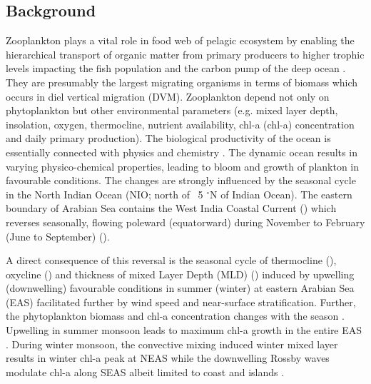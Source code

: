 \documentclass{article}
\begin{document}
	\subsection{Background}
	Zooplankton plays a vital role in food web of pelagic ecosystem by enabling the hierarchical transport of organic matter from primary producers to higher trophic levels impacting the fish population \citep{ohman2001density} and the carbon pump of the deep ocean \citep{le2016global}. They are presumably the largest migrating organisms in terms of biomass \citep{hays2003review} which occurs in diel vertical migration (DVM). Zooplankton depend not only on phytoplankton but other environmental parameters (e.g. mixed layer depth, insolation, oxygen, thermocline, nutrient availability, chl-a (chl-a) concentration and daily primary production). The biological productivity of the ocean is essentially connected with physics and chemistry \citep{subrahmanyan1959studiespart2, ryther1966primary, qasim1977biological, nair1970primary,banse1995zooplankton,mccreary2009biophysical, vijith2016consequences,amol2020modulation}. The dynamic ocean results in varying physico-chemical properties, leading to bloom and growth of plankton in favourable conditions. The changes are strongly influenced by the seasonal cycle in the North Indian Ocean (NIO; north of ~5 $^{\circ}$N of Indian Ocean). The eastern boundary of Arabian Sea contains the West India Coastal Current (\citep[WICC]{ramamirtham1965hydrography, banse1968hydrography, shetye1990hydrography,mccreary1993numerical, amol2014observed, vijith2016consequences, chaudhuri2020observed}) which reverses seasonally, flowing poleward (equatorward) during November to February (June to September) (\citep{shetye1990hydrography,shetye19911517,vijith2022circulation}). 
	
	A direct consequence of this reversal is the seasonal cycle of thermocline (\citep{prasad1996mixed,prasannakumara20051848}), oxycline (\citep{desousa1996seasonal,schmidt2020seasonal}) and thickness of mixed Layer Depth (MLD) (\citep{shetye19911517,prasad1996mixed,prasannakumara20051848}) induced by upwelling (downwelling) favourable conditions in summer (winter) at eastern Arabian Sea (EAS) facilitated further by wind speed and near-surface stratification. Further, the phytoplankton biomass and chl-a concentration changes with the season \citep{subrahmanyan1960studies, banse1968hydrography,prasannakumara20051848,levy2007basin, vijith2016consequences}. Upwelling in  summer monsoon leads to maximum chl-a growth in the entire EAS \citep{banse1968hydrography, banse2000geographical, mccreary2009biophysical, hood2017biogeochemical,bemal2018picophytoplankton,shi2022phytoplankton}. During winter monsoon, the convective mixing induced winter mixed layer \citep{shetye1992does, madhupratap1996mechanism,mccreary1996four, levy2007basin,  shankar2016inhibition, vijith2016consequences, keerthi2017physical,shi2022phytoplankton} results in winter chl-a peak at NEAS while the downwelling Rossby waves modulate chl-a along SEAS albeit limited to coast and islands \citep{amol2020modulation}. 
	
\end{document}
